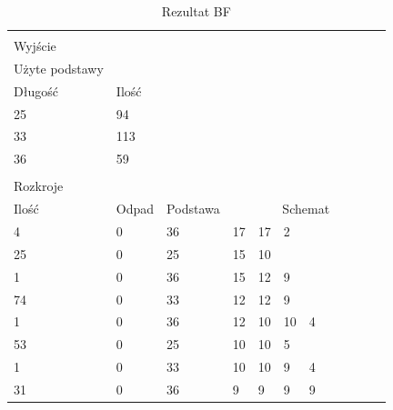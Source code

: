 \clearpage
\begin{longtable}{llllllllllll}
  \caption{Rezultat BF}\label{tab:bf_result} \\
  \hline \\
  Wyjście               &          &           &                  &    &    &   &   &   &   &   &   \\
  Użyte podstawy     &          &           &                  &    &    &   &   &   &   &   &   \\
  Długość               & Ilość &           &                  &    &    &   &   &   &   &   &   \\
  25                   & 94       &           &                  &    &    &   &   &   &   &   &   \\
  33                   & 113      &           &                  &    &    &   &   &   &   &   &   \\
  36                   & 59       &           &                  &    &    &   &   &   &   &   &   \\
                       &          &           &                  &    &    &   &   &   &   &   &   \\
  Rozkroje         &          &           &                  &    &    &   &   &   &   &   &   \\
  Ilość             & Odpad    & Podstawa &  \multicolumn{9}{c}{Schemat} \\
  4                    & 0        & 36        & 17               & 17 & 2  &   &   &   &   &   &   \\
  25                   & 0        & 25        & 15               & 10 &    &   &   &   &   &   &   \\
  1                    & 0        & 36        & 15               & 12 & 9  &   &   &   &   &   &   \\
  74                   & 0        & 33        & 12               & 12 & 9  &   &   &   &   &   &   \\
  1                    & 0        & 36        & 12               & 10 & 10 & 4 &   &   &   &   &   \\
  53                   & 0        & 25        & 10               & 10 & 5  &   &   &   &   &   &   \\
  1                    & 0        & 33        & 10               & 10 & 9  & 4 &   &   &   &   &   \\
  31                   & 0        & 36        & 9                & 9  & 9  & 9 &   &   &   &   &   \\

\end{longtable}
